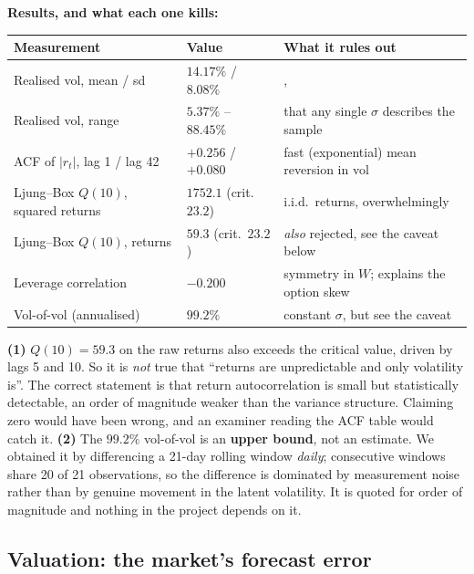 \documentclass[11pt,a4paper]{article}
\begin{document}
\textbf{Results, and what each one kills:}
\begin{table}[H]
\centering\small
\begin{tabular}{L{4.6cm}L{3.0cm}L{7.3cm}}
\toprule
\textbf{Measurement} & \textbf{Value} & \textbf{What it rules out} \\
\midrule
Realised vol, mean / sd & $14.17\%$ / $8.08\%$ &, \\
Realised vol, range & $5.37\%$ -- $88.45\%$ & that any single $\sigma$ describes the sample \\
ACF of $|r_t|$, lag 1 / lag 42 & $+0.256$ / $+0.080$ & fast (exponential) mean reversion in vol \\
Ljung--Box $Q(10)$, squared returns & $\mathbf{1752.1}$ (crit.\ $23.2$) & i.i.d.\ returns, overwhelmingly \\
Ljung--Box $Q(10)$, returns & $59.3$ (crit.\ $23.2$) & \emph{also} rejected, see the caveat below \\
Leverage correlation & $-0.200$ & symmetry in $W$; explains the option skew \\
Vol-of-vol (annualised) & $99.2\%$ & constant $\sigma$, but see the caveat \\
\bottomrule
\end{tabular}
\end{table}

\begin{trapbox}
\textbf{(1)} $Q(10)=59.3$ on the raw returns also exceeds the critical value, driven by lags 5
and 10. So it is \emph{not} true that ``returns are unpredictable and only volatility is''. The
correct statement is that return autocorrelation is small but statistically detectable, an
order of magnitude weaker than the variance structure. Claiming zero would have been wrong, and
an examiner reading the ACF table would catch it.
\smallskip
\textbf{(2)} The $99.2\%$ vol-of-vol is an \textbf{upper bound}, not an estimate. We obtained it
by differencing a 21-day rolling window \emph{daily}; consecutive windows share 20 of 21
observations, so the difference is dominated by measurement noise rather than by genuine
movement in the latent volatility. It is quoted for order of magnitude and nothing in the
project depends on it.
\end{trapbox}

\subsection{Valuation: the market's forecast error}
\end{document}
